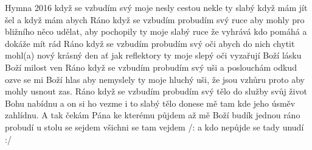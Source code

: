 \begin{TEXT}{Hymna 2016}
\SLOKA {} když se vzbudím  svý \NL
{} moje  nesly  cestou \NL
{} nekle ty  slabý \NL
{} když mám jít šel a když  mám abych  
\SLOKA Ráno když se vzbudím probudím svý ruce\NL
aby mohly pro bližního něco udělat,\NL
aby pochopily ty moje slabý ruce\NL
že vyhrává kdo pomáhá a dokáže mít rád 
\SLOKA Ráno když se vzbudím probudím svý oči\NL
abych do nich chytit mohl(a) nový krásný den\NL
ať jak reflektory ty moje slepý oči\NL
vyzařují Boží lásku Boží milost ven
\SLOKA Ráno když se vzbudím probudím svý uši \NL
a poslouchám odkud ozve se mi Boží hlas\NL
aby nemyslely ty moje hluchý uši, \NL
že jsou vzhůru proto aby mohly usnout zas.
\SLOKA Ráno když se vzbudím probudím svý tělo\NL
do služby svůj život Bohu nabídnu \NL
a on si ho vezme i to slabý tělo\NL
donese mě tam kde jeho úsměv zahlídnu.
\SLOKA A tak čekám Pána ke kterému půjdem\NL
až mě Boží budík jednou ráno probudí\NL
u stolu se sejdem všichni se tam vejdem\NL
/: a kdo nepůjde se tady unudí :/
\end{TEXT}

